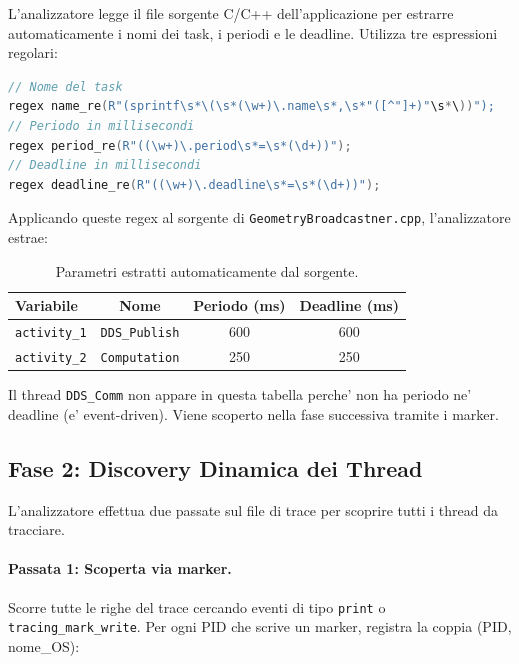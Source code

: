 L'analizzatore legge il file sorgente C/C++ dell'applicazione per estrarre
automaticamente i nomi dei task, i periodi e le deadline. Utilizza tre
espressioni regolari:

\begin{lstlisting}[language=C++, caption={Regex per estrazione parametri dal sorgente.}, label={lst:regex}]
// Nome del task
regex name_re(R"(sprintf\s*\(\s*(\w+)\.name\s*,\s*"([^"]+)"\s*\))");
// Periodo in millisecondi
regex period_re(R"((\w+)\.period\s*=\s*(\d+))");
// Deadline in millisecondi
regex deadline_re(R"((\w+)\.deadline\s*=\s*(\d+))");
\end{lstlisting}

Applicando queste regex al sorgente di \texttt{GeometryBroadcastner.cpp},
l'analizzatore estrae:

\begin{table}[htbp]
\centering
\caption{Parametri estratti automaticamente dal sorgente.}
\label{tab:params}
\begin{tabular}{lccc}
\toprule
\textbf{Variabile} & \textbf{Nome} & \textbf{Periodo (ms)} & \textbf{Deadline (ms)} \\
\midrule
\texttt{activity\_1} & \texttt{DDS\_Publish} & 600 & 600 \\
\texttt{activity\_2} & \texttt{Computation}  & 250 & 250 \\
\bottomrule
\end{tabular}
\end{table}

Il thread \texttt{DDS\_Comm} non appare in questa tabella perche' non
ha periodo ne' deadline (e' event-driven). Viene scoperto nella fase
successiva tramite i marker.

\subsection{Fase 2: Discovery Dinamica dei Thread}
\label{subsec:discovery}

L'analizzatore effettua due passate sul file di trace per scoprire
tutti i thread da tracciare.

\paragraph{Passata 1: Scoperta via marker.}
Scorre tutte le righe del trace cercando eventi di tipo \texttt{print}
o \texttt{tracing\_mark\_write}. Per ogni PID che scrive un marker,
registra la coppia (PID, nome\_OS):

